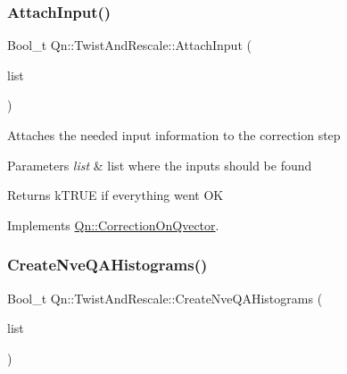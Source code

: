 \mbox{\label{classQn_1_1TwistAndRescale_af6ca5526d392329f6f35adcc261de349}} 
\subsubsection{\texorpdfstring{Attach\+Input()}{AttachInput()}}
{\footnotesize\ttfamily Bool\+\_\+t Qn\+::\+Twist\+And\+Rescale\+::\+Attach\+Input (\begin{DoxyParamCaption}\item[{T\+List $\ast$}]{list }\end{DoxyParamCaption})\hspace{0.3cm}{\ttfamily [virtual]}}

Attaches the needed input information to the correction step 
\begin{DoxyParams}{Parameters}
{\em list} & list where the inputs should be found \\
\hline
\end{DoxyParams}
\begin{DoxyReturn}{Returns}
k\+T\+R\+UE if everything went OK 
\end{DoxyReturn}


Implements \mbox{\hyperlink{classQn_1_1CorrectionOnQvector_acb7165c2eb071517fa977484bee7e445}{Qn\+::\+Correction\+On\+Qvector}}.

\mbox{\label{classQn_1_1TwistAndRescale_ae60ae563330df4beb9edd3fb99a9fc31}} 
\subsubsection{\texorpdfstring{Create\+Nve\+Q\+A\+Histograms()}{CreateNveQAHistograms()}}
{\footnotesize\ttfamily Bool\+\_\+t Qn\+::\+Twist\+And\+Rescale\+::\+Create\+Nve\+Q\+A\+Histograms (\begin{DoxyParamCaption}\item[{T\+List $\ast$}]{list }\end{DoxyParamCaption})\hspace{0.3cm}{\ttfamily [virtual]}}

